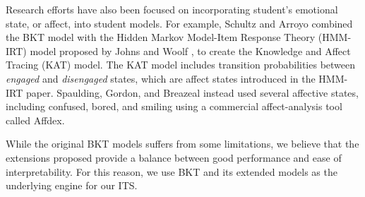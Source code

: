 \documentclass[12pt,a4paper]{article}
\begin{document}
Research efforts have also been focused on incorporating student's emotional state, or affect, into student models. For example, Schultz and Arroyo \cite{schultz2014tracing} combined the BKT model with the Hidden Markov Model-Item Response Theory (HMM-IRT) model proposed by Johns and Woolf \cite{johns2006dynamic}, to create the Knowledge and Affect Tracing (KAT) model. The KAT model includes transition probabilities between \textit{engaged} and \textit{disengaged} states, which are affect states introduced in the HMM-IRT paper. Spaulding, Gordon, and Breazeal \cite{spaulding2016affect} instead used several affective states, including confused, bored, and smiling using a commercial affect-analysis tool called Affdex.

While the original BKT models suffers from some limitations, we believe that the extensions proposed provide a balance between good performance and ease of interpretability. For this reason, we use BKT and its extended models as the underlying engine for our ITS.



\end{document}
